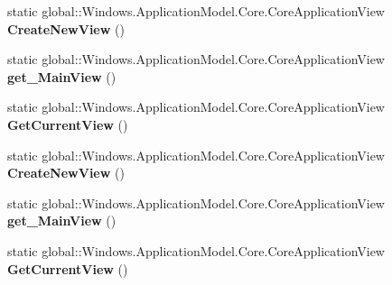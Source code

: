 \begin{DoxyCompactItemize}
\item 
\mbox{\label{class_windows_1_1_application_model_1_1_core_1_1_core_application_a4e53b3d6a84ea44252e4cfec6f62e6a4}} 
static global\+::\+Windows.\+Application\+Model.\+Core.\+Core\+Application\+View {\bfseries Create\+New\+View} ()
\item 
\mbox{\label{class_windows_1_1_application_model_1_1_core_1_1_core_application_a1dc848a12769626943e8ba6adec479e6}} 
static global\+::\+Windows.\+Application\+Model.\+Core.\+Core\+Application\+View {\bfseries get\+\_\+\+Main\+View} ()
\item 
\mbox{\label{class_windows_1_1_application_model_1_1_core_1_1_core_application_ab4ec88df76ae8ee8183735b12e8090bf}} 
static global\+::\+Windows.\+Application\+Model.\+Core.\+Core\+Application\+View {\bfseries Get\+Current\+View} ()
\item 
\mbox{\label{class_windows_1_1_application_model_1_1_core_1_1_core_application_a4e53b3d6a84ea44252e4cfec6f62e6a4}} 
static global\+::\+Windows.\+Application\+Model.\+Core.\+Core\+Application\+View {\bfseries Create\+New\+View} ()
\item 
\mbox{\label{class_windows_1_1_application_model_1_1_core_1_1_core_application_a1dc848a12769626943e8ba6adec479e6}} 
static global\+::\+Windows.\+Application\+Model.\+Core.\+Core\+Application\+View {\bfseries get\+\_\+\+Main\+View} ()
\item 
\mbox{\label{class_windows_1_1_application_model_1_1_core_1_1_core_application_ab4ec88df76ae8ee8183735b12e8090bf}} 
static global\+::\+Windows.\+Application\+Model.\+Core.\+Core\+Application\+View {\bfseries Get\+Current\+View} ()
\item 
\mbox{\label{class_windows_1_1_application_model_1_1_core_1_1_core_application_a4e53b3d6a84ea44252e4cfec6f62e6a4}} 

\end{DoxyCompactItemize}

